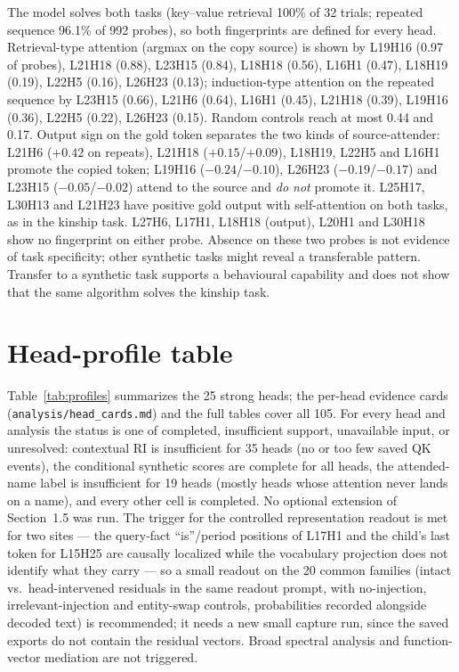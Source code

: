 \documentclass[11pt,a4paper]{article}
\begin{document}
The model solves both tasks (key--value retrieval 100\% of 32 trials; repeated
sequence 96.1\% of 992 probes), so both fingerprints are defined for every head.
Retrieval-type attention (argmax on the copy source) is shown by L19H16 (0.97 of
probes), L21H18 (0.88), L23H15 (0.84), L18H18 (0.56), L16H1 (0.47), L18H19 (0.19),
L22H5 (0.16), L26H23 (0.13); induction-type attention on the repeated sequence by
L23H15 (0.66), L21H6 (0.64), L16H1 (0.45), L21H18 (0.39), L19H16 (0.36), L22H5
(0.22), L26H23 (0.15). Random controls reach at most 0.44 and 0.17. Output sign on the
gold token separates the two kinds of source-attender: L21H6 ($+0.42$ on repeats),
L21H18 ($+0.15$/$+0.09$), L18H19, L22H5 and L16H1 promote the copied token; L19H16
($-0.24$/$-0.10$), L26H23 ($-0.19$/$-0.17$) and L23H15 ($-0.05$/$-0.02$) attend to
the source and \emph{do not} promote it. L25H17, L30H13 and L21H23 have positive gold
output with self-attention on both tasks, as in the kinship task. L27H6, L17H1, L18H18
(output), L20H1 and L30H18 show no fingerprint on either probe. Absence on these two
probes is not evidence of task specificity; other synthetic tasks might reveal a
transferable pattern. Transfer to a synthetic task supports a behavioural
capability and does not show that the same algorithm solves the kinship task.

\section{Head-profile table}
\label{sec:cards}


Table~\ref{tab:profiles} summarizes the 25 strong heads; the per-head evidence cards
(\texttt{analysis/head\_cards.md}) and the full tables cover all 105. For every head
and analysis the status is one of completed, insufficient support, unavailable input,
or unresolved: contextual RI is insufficient for 35 heads (no or too few saved QK
events), the conditional synthetic scores are complete for all heads, the
attended-name label is insufficient for 19 heads (mostly heads whose attention never
lands on a name), and every other cell is completed.
No optional extension of Section~1.5 was run. The trigger for the controlled
representation readout is met for two sites --- the query-fact ``is''/period positions
of L17H1 and the child's last token for L15H25 are causally localized while the
vocabulary projection does not identify what they carry --- so a small readout on the 20
common families (intact vs.\ head-intervened residuals in the same readout prompt, with
no-injection, irrelevant-injection and entity-swap controls, probabilities recorded
alongside decoded text) is recommended; it needs a new small capture run, since the
saved exports do not contain the residual vectors. Broad spectral analysis and
function-vector mediation are not triggered.
\end{document}
